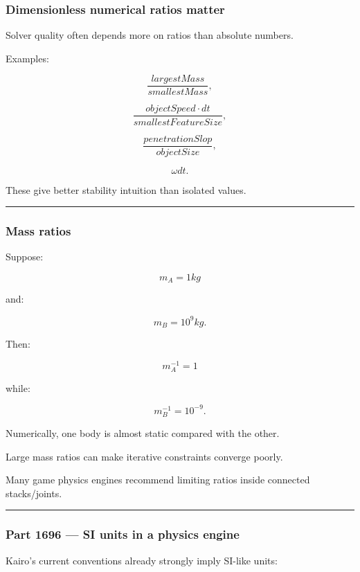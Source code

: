 \subsubsection{Dimensionless numerical ratios matter}\label{dimensionless-numerical-ratios-matter}

Solver quality often depends more on ratios than absolute numbers.

Examples:

\[
\frac{largestMass}{smallestMass},
\]

\[
\frac{objectSpeed\cdot dt}{smallestFeatureSize},
\]

\[
\frac{penetrationSlop}{objectSize},
\]

\[
\omega dt.
\]

These give better stability intuition than isolated values.

\begin{center}\rule{0.5\linewidth}{0.5pt}\end{center}

\subsubsection{Mass ratios}\label{mass-ratios}

Suppose:

\[
m_A=1kg
\]

and:

\[
m_B=10^9kg.
\]

Then:

\[
m_A^{-1}=1
\]

while:

\[
m_B^{-1}=10^{-9}.
\]

Numerically, one body is almost static compared with the other.

Large mass ratios can make iterative constraints converge poorly.

Many game physics engines recommend limiting ratios inside connected stacks/joints.

\begin{center}\rule{0.5\linewidth}{0.5pt}\end{center}

\subsubsection{Part 1696 --- SI units in a physics engine}\label{part-1696-si-units-in-a-physics-engine}

Kairo's current conventions already strongly imply SI-like units:

